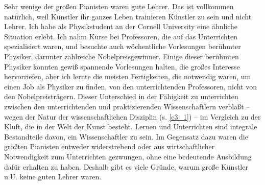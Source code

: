 Sehr wenige der großen Pianisten waren gute Lehrer.
Das ist vollkommen natürlich, weil Künstler ihr ganzes Leben trainieren Künstler zu sein und nicht Lehrer.
Ich habe als Physikstudent an der Cornell University eine ähnliche Situation erlebt. Ich nahm Kurse bei Professoren, die auf das Unterrichten spezialisiert waren, und besuchte auch wöchentliche Vorlesungen berühmter Physiker, darunter zahlreiche Nobelpreisgewinner.
Einige dieser berühmten Physiker konnten gewiß spannende Vorlesungen halten, die großes Interesse hervorriefen, aber ich lernte die meisten Fertigkeiten, die notwendig waren, um einen Job als Physiker zu finden, von den unterrichtenden Professoren, nicht von den Nobelpreisträgern.
Dieser Unterschied in der Fähigkeit zu unterrichten zwischen den unterrichtenden und praktizierenden Wissenschaftlern verblaßt -- wegen der Natur der wissenschaftlichen Disziplin (s. \hyperref[c3_1]{\autoref{c3_1}}) -- im Vergleich zu der Kluft, die in der Welt der Kunst besteht.
Lernen und Unterrichten sind integrale Bestandteile davon, ein Wissenschaftler zu sein.
Im Gegensatz dazu waren die größten Pianisten entweder widerstrebend oder aus wirtschaftlicher Notwendigkeit zum Unterrichten gezwungen, ohne eine bedeutende Ausbildung dafür erhalten zu haben.
Deshalb gibt es viele Gründe, warum große Künstler u.U. keine guten Lehrer waren.


